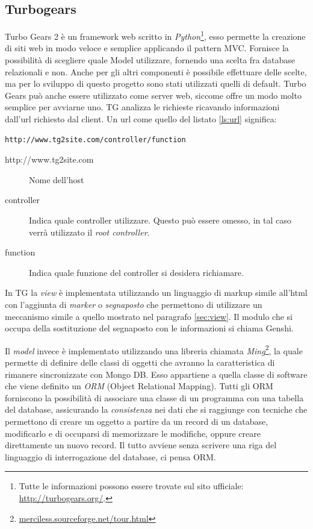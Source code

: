 \subsection{Turbogears}\label{sec:tg}
Turbo Gears 2 è un framework web scritto in \emph{Python}\footnote{Tutte le informazioni possono essere trovate sul sito ufficiale: \url{http://turbogears.org/}.}, esso permette la creazione di siti web in modo veloce e semplice applicando il pattern MVC. Fornisce la possibilità di scegliere quale Model utilizzare, fornendo una scelta fra database relazionali e non. Anche per gli altri componenti è possibile effettuare delle scelte, ma per lo sviluppo di questo progetto sono stati utilizzati quelli di default.
Turbo Gears può anche essere utilizzato come server web, siccome offre un modo molto semplice per avviarne uno.
TG analizza le richieste ricavando informazioni dall'url richiesto dal client. Un url come quello del listato \ref{ls:url} significa:
\begin{lstlisting}[label=ls:url,caption={Url per la richiesta di una pagina}]
http://www.tg2site.com/controller/function
\end{lstlisting}
		
\begin{description}
\item[http://www.tg2site.com] 
		
Nome dell'host
\item[controller]
		
Indica quale controller utilizzare. Questo può essere omesso, in tal caso verrà utilizzato il \emph{root controller}.
\item[function]
		
Indica quale funzione del controller si desidera richiamare.
\end{description}

In TG la \emph{view} è implementata utilizzando un linguaggio di markup simile all'html con l'aggiunta di \emph{marker} o \emph{segnaposto} che permettono di utilizzare un meccanismo simile a quello mostrato nel paragrafo \ref{sec:view}. Il modulo che si occupa della sostituzione del segnaposto con le informazioni si chiama Genshi.

Il \emph{model} invece è implementato utilizzando una libreria chiamata \emph{Ming}\footnote{\url{merciless.sourceforge.net/tour.html}}, la quale permette di definire delle classi di oggetti che avranno la caratteristica di rimanere sincronizzate con Mongo DB. Esso appartiene a quella classe di software che viene definito un \emph{ORM} (Object Relational Mapping). Tutti gli ORM forniscono la possibilità di associare una classe di un programma con una tabella del database, assicurando la \emph{consistenza} nei dati che si raggiunge con tecniche che permettono di creare un oggetto a partire da un record di un database, modificarlo e di occuparsi di memorizzare le modifiche, oppure creare direttamente un nuovo record. Il tutto avviene senza scrivere una riga del linguaggio di interrogazione del database, ci pensa ORM. 

